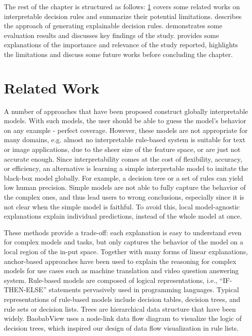 \hspace*{3.5mm} The rest of the chapter is structured as follows: \cref{chapter_7:rw} covers some related works on interpretable decision rules and summarize their potential limitations.  describes the approach of generating explainable decision rules.  demonstrates some evaluation results and discusses key findings of the study.  provides some explanations of the importance and relevance of the study reported, highlights the limitations and discuss some future works before concluding the chapter.  

\section{Related Work} \label{chapter_7:rw}
A number of approaches that have been proposed construct globally interpretable models. With such models, the user should be able to guess the model’s behavior on any example - perfect coverage. However, these models are not appropriate for many domains, e.g. almost no interpretable rule-based system is suitable for text or image applications, due to the sheer size of the feature space, or are just not accurate enough. 
Since interpretability comes at the cost of flexibility, accuracy, or efficiency, an alternative is learning a simple interpretable model to imitate the black-box model globally. For example, a decision tree or a set of rules can yield low human precision. Simple models are not able to fully capture the behavior of the complex ones, and thus lead users to wrong conclusions, especially since it is not clear when the simple model is faithful. To avoid this, local model-agnostic explanations explain individual predictions, instead of the whole model at once. 

\hspace*{3.5mm} These methods provide a trade-off: each explanation is easy to understand even for complex models and tasks, but only captures the behavior of the model on a local region of the in-put space. Together with many forms of linear explanations, anchor-based approaches have been used to explain the reasoning for complex models for use cases such as machine translation and video question answering system. 
Rule-based models are composed of logical representations, i.e., ``IF-THEN-ELSE'' statements pervasively used in programming languages. Typical representations of rule-based models include decision tables, decision trees, and rule sets or decision lists. Trees are hierarchical data structure that have been widely. BaobabView uses a node-link data flow diagram to visualize the logic of decision trees, which inspired our design of data flow visualization in rule lists. 

